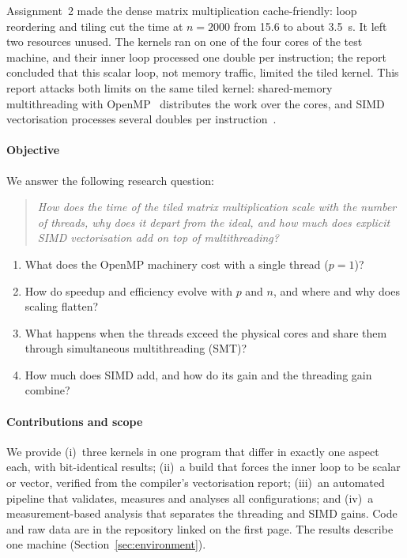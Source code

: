 \documentclass[conference,a4paper]{IEEEtran}
\begin{document}
Assignment~2 made the dense matrix multiplication cache-friendly: loop
reordering and tiling cut the time at $n = 2000$ from 15.6 to about 3.5~s. It
left two resources unused. The kernels ran on one of the four cores of the
test machine, and their inner loop processed one double per instruction; the
report concluded that this scalar loop, not memory traffic, limited the tiled
kernel. This report attacks both limits on the same tiled kernel: shared-memory
multithreading with OpenMP~\cite{openmp52,chapman2008} distributes the work
over the cores, and SIMD vectorisation processes several doubles per
instruction~\cite{hennessy2017}.

\paragraph{Objective} We answer the following research question:

\begin{quote}
\emph{How does the time of the tiled matrix multiplication scale with the
number of threads, why does it depart from the ideal, and how much does
explicit SIMD vectorisation add on top of multithreading?}
\end{quote}

\begin{enumerate}[label=\textbf{RQ\arabic*.}, leftmargin=3.2em, itemsep=1pt]
  \item What does the OpenMP machinery cost with a single thread ($p = 1$)?
  \item How do speedup and efficiency evolve with $p$ and $n$, and where and
        why does scaling flatten?
  \item What happens when the threads exceed the physical cores and share
        them through simultaneous multithreading (SMT)?
  \item How much does SIMD add, and how do its gain and the threading gain
        combine?
\end{enumerate}

\paragraph{Contributions and scope} We provide (i)~three kernels in one program
that differ in exactly one aspect each, with bit-identical results;
(ii)~a build that forces the inner loop to be scalar or vector, verified from
the compiler's vectorisation report; (iii)~an automated pipeline that
validates, measures and analyses all configurations; and (iv)~a
measurement-based analysis that separates the threading and SIMD gains. Code
and raw data are in the repository linked on the first page. The results
describe one machine (Section~\ref{sec:environment}).
\end{document}
